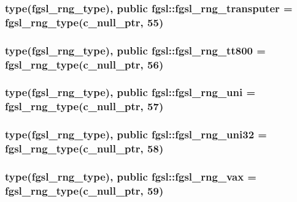 \subsubsection[{fgsl\+\_\+rng\+\_\+transputer}]{\setlength{\rightskip}{0pt plus 5cm}type({\bf fgsl\+\_\+rng\+\_\+type}), public fgsl\+::fgsl\+\_\+rng\+\_\+transputer = {\bf fgsl\+\_\+rng\+\_\+type}(c\+\_\+null\+\_\+ptr, 55)}\label{namespacefgsl_ae6f6fd654d8c94d4ff5cf3a3eb274ccb}
\hypertarget{namespacefgsl_a1ec0bdbcac349e419b11ccb34d994e2d}{}
\subsubsection[{fgsl\+\_\+rng\+\_\+tt800}]{\setlength{\rightskip}{0pt plus 5cm}type({\bf fgsl\+\_\+rng\+\_\+type}), public fgsl\+::fgsl\+\_\+rng\+\_\+tt800 = {\bf fgsl\+\_\+rng\+\_\+type}(c\+\_\+null\+\_\+ptr, 56)}\label{namespacefgsl_a1ec0bdbcac349e419b11ccb34d994e2d}
\hypertarget{namespacefgsl_aaa640575921c58278aa5f851482cd072}{}
\subsubsection[{fgsl\+\_\+rng\+\_\+uni}]{\setlength{\rightskip}{0pt plus 5cm}type({\bf fgsl\+\_\+rng\+\_\+type}), public fgsl\+::fgsl\+\_\+rng\+\_\+uni = {\bf fgsl\+\_\+rng\+\_\+type}(c\+\_\+null\+\_\+ptr, 57)}\label{namespacefgsl_aaa640575921c58278aa5f851482cd072}
\hypertarget{namespacefgsl_a762bd46602bef4b69b29c76cbb184687}{}
\subsubsection[{fgsl\+\_\+rng\+\_\+uni32}]{\setlength{\rightskip}{0pt plus 5cm}type({\bf fgsl\+\_\+rng\+\_\+type}), public fgsl\+::fgsl\+\_\+rng\+\_\+uni32 = {\bf fgsl\+\_\+rng\+\_\+type}(c\+\_\+null\+\_\+ptr, 58)}\label{namespacefgsl_a762bd46602bef4b69b29c76cbb184687}
\hypertarget{namespacefgsl_a85a32537847b642a47c056213ad0c1a6}{}
\subsubsection[{fgsl\+\_\+rng\+\_\+vax}]{\setlength{\rightskip}{0pt plus 5cm}type({\bf fgsl\+\_\+rng\+\_\+type}), public fgsl\+::fgsl\+\_\+rng\+\_\+vax = {\bf fgsl\+\_\+rng\+\_\+type}(c\+\_\+null\+\_\+ptr, 59)}\label{namespacefgsl_a85a32537847b642a47c056213ad0c1a6}
\hypertarget{namespacefgsl_a47b92bfccacd568a2f9c08efbc2cb660}{}

